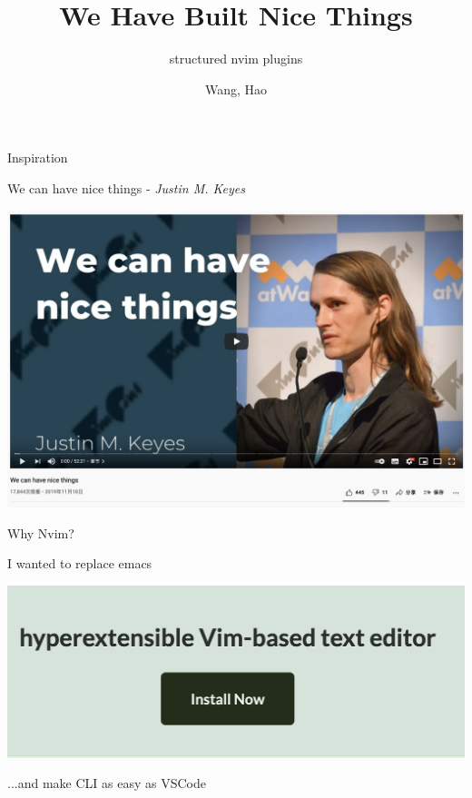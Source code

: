 \documentclass{beamer}
\title{We Have Built Nice Things}
\subtitle{structured nvim plugins}
\author{Wang, Hao}
\institute{Lead Engineer @ Graveflex}
\date{}
\begin{document}
\begin{frame}


	\titlepage

\end{frame}


\begin{frame}{Inspiration}

	We can have nice things - \textit{Justin M. Keyes}

	\vspace{1em}

	\includegraphics[width=\textwidth]{we_can_have_nice}

\end{frame}


\begin{frame}{Why Nvim?}

	I wanted to replace emacs

	\vspace{1em}

	\includegraphics[width=\textwidth]{home_page}

	\vspace{1em}

	...and make CLI as easy as VSCode

\end{frame}
\end{document}
